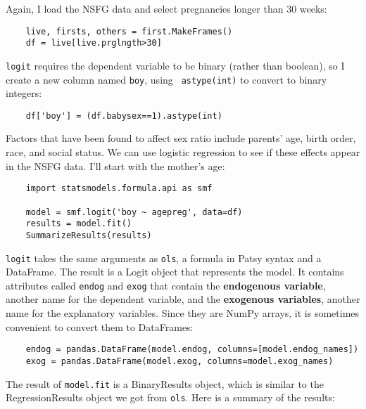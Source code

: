 Again, I load the NSFG data and select pregnancies longer than
30 weeks:

\begin{verbatim}
    live, firsts, others = first.MakeFrames()
    df = live[live.prglngth>30]
\end{verbatim}

{\tt logit} requires the dependent variable to be binary (rather than
boolean), so I create a new column named {\tt boy}, using {\tt
  astype(int)} to convert to binary integers:

\begin{verbatim}
    df['boy'] = (df.babysex==1).astype(int)
\end{verbatim}

Factors that have been found to affect sex ratio include parents'
age, birth order, race, and social status.  We can use logistic
regression to see if these effects appear in the NSFG data.  I'll
start with the mother's age:

\begin{verbatim}
    import statsmodels.formula.api as smf

    model = smf.logit('boy ~ agepreg', data=df)
    results = model.fit()
    SummarizeResults(results)
\end{verbatim}

{\tt logit} takes the same arguments as {\tt ols}, a formula
in Patsy syntax and a DataFrame.  The result is a Logit object
that represents the model.  It contains attributes called
{\tt endog} and {\tt exog} that contain the {\bf endogenous
variable}, another name for the dependent variable,
and the {\bf exogenous variables}, another name for the
explanatory variables.  Since they are NumPy arrays, it is
sometimes convenient to convert them to DataFrames:

\begin{verbatim}
    endog = pandas.DataFrame(model.endog, columns=[model.endog_names])
    exog = pandas.DataFrame(model.exog, columns=model.exog_names)
\end{verbatim}

The result of {\tt model.fit} is a BinaryResults object, which is
similar to the RegressionResults object we got from {\tt ols}.
Here is a summary of the results:

